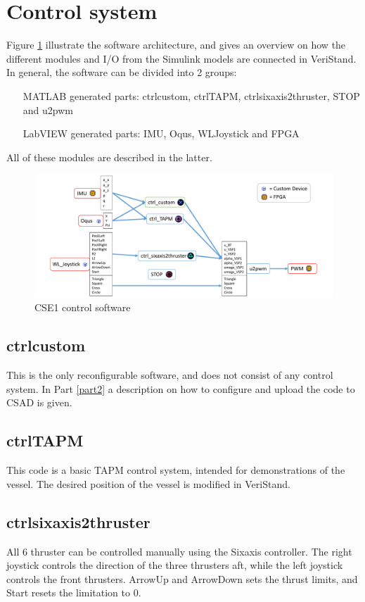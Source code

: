 \section{Control system}
Figure \ref{fig: CSE1 software} illustrate the software architecture, and gives an overview on how the different modules and I/O from the Simulink models are connected in VeriStand. In general, the software can be divided into 2 groups: 
\begin{itemize}
	\item[MATLAB] generated parts: ctrl\textunderscore custom, ctrl\textunderscore TAPM, ctrl\textunderscore sixaxis2thruster, STOP and u2pwm
	\item[LabVIEW] generated parts: IMU, Oqus, WL\textunderscore Joystick and FPGA
\end{itemize}
All of these modules are described in the latter. 
\begin{figure}[htb!]
	\centering
	\includegraphics[width=\textwidth]{fig/software_overview.pdf}
	\caption{CSE1 control software}
	\label{fig: CSE1 software}
\end{figure}

\subsection{ctrl\textunderscore custom}
This is the only reconfigurable software, and does not consist of any control system. In Part \ref{part2} a description on how to configure and upload the code to CSAD is given. 
\subsection{ctrl\textunderscore TAPM}
This code is a basic TAPM control system, intended for demonstrations of the vessel. The desired position of the vessel is modified in VeriStand. 
\subsection{ctrl\textunderscore sixaxis2thruster}
All 6 thruster can be controlled manually using the Sixaxis controller. The right joystick controls the direction of the three thrusters aft, while the left joystick controls the front thrusters. ArrowUp and ArrowDown sets the thrust limits, and  Start resets the limitation to 0. 

